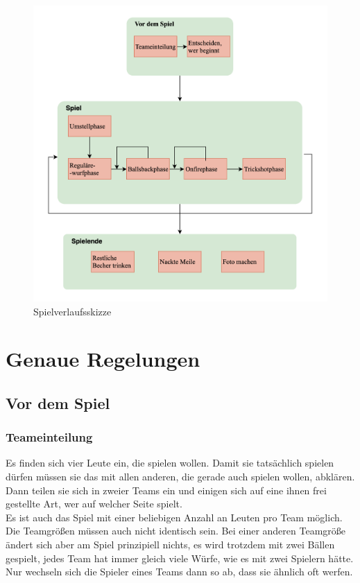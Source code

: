 \documentclass[a5paper, 12pt]{book}
\begin{document}
\begin{figure} 
    \centering
    \hspace*{-1.5cm}\includegraphics[scale = 0.27]{Bierpongflowneu.png}
    \caption{Spielverlaufsskizze}
    \label{fig:bierpongflow}
\end{figure}

\section{Genaue Regelungen}
\subsection{Vor dem Spiel}
\subsubsection{Teameinteilung}\label{teameinteilung}
Es finden sich vier Leute ein, die spielen wollen. Damit sie tatsächlich spielen dürfen müssen sie das mit allen anderen, die gerade auch spielen wollen, abklären. Dann teilen sie sich in zweier Teams ein und einigen sich auf eine ihnen frei gestellte Art, wer auf welcher Seite spielt. \\
Es ist auch das Spiel mit einer beliebigen Anzahl an Leuten pro Team möglich. Die Teamgrößen müssen auch nicht identisch sein. Bei einer anderen Teamgröße ändert sich aber am Spiel prinzipiell nichts, es wird trotzdem mit zwei Bällen gespielt, jedes Team hat immer gleich viele Würfe, wie es mit zwei Spielern hätte. Nur wechseln sich die Spieler eines Teams dann so ab, dass sie ähnlich oft werfen.
\end{document}
